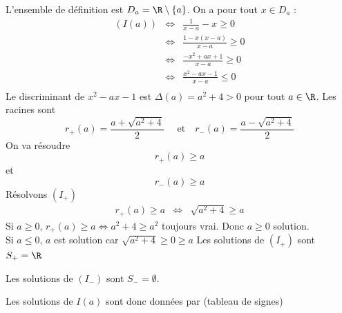 \begin{correction}
L'ensemble de définition est $D_a= \R\setminus \{ a\}$. 
On a pour tout $x\in D_a$ : 
\begin{eqnarray*}
(I(a))  &\Longleftrightarrow &\frac{1}{x-a}  -x  \geq 0\\
	&\Longleftrightarrow &\frac{1-x(x-a)}{x-a}  \geq 0\\
	&\Longleftrightarrow &\frac{- x^2 + ax+1}{x-a}  \geq 0\\
	&\Longleftrightarrow &\frac{x^2-ax-1}{x-a}  \leq 0 \\
\end{eqnarray*}
Le discriminant de $x^2-ax-1$ est $\Delta(a) = a^2+4>0$ pour tout $a\in \R$. 
Les racines sont 
$$r_+ (a) = \frac{a+\sqrt{a^2+4}}{2} \quad \text{ et} \quad r_- (a) = \frac{a-\sqrt{a^2+4}}{2} $$
On va résoudre
\begin{equation}\tag{$I_+$}
r_+(a) \geq a 
\end{equation} 
 et 
\begin{equation}\tag{$I_-$}
r_-(a) \geq a
\end{equation} 
Résolvons $(I_+)$
\begin{eqnarray}
r_+(a) \geq a &\Longleftrightarrow & \sqrt{a^2+4} \geq a
\end{eqnarray}
Si $a\geq 0$, $ r_+(a) \geq a \Longleftrightarrow  a^2+4 \geq a^2$ toujours vrai. Donc $a\geq 0 $ solution. \\
Si $a\leq 0$, $a$ est solution car $ \sqrt{a^2+4} \geq 0\geq a$
Les solutions de $(I_+)$ sont $S_+=\R$


Les solutions de $(I_-)$ sont $S_-=\emptyset$.


Les solutions de $I(a)$ sont donc données par (tableau de signes)
\conclusion{$]-\infty, r_-(a)]\cup ]a, r_+(a)]$)}

\end{correction}




